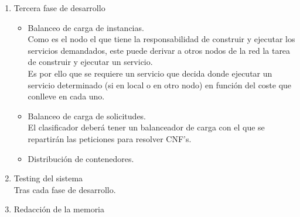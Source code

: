 \documentclass[11pt]{article}
\begin{document}
\begin{enumerate}
\begin{itemize}
					Por un lado se ha de desarrollar un sistema que genere CNFs aleatorios, 
					pruebe cada uno de los solvers y recoja datos de ello. 
					A partir de los datos obtenidos previamente se deben clasificar los solvers mediante algun tipo de regresión.
					\\
					Por otra parte, el servicio debe de tener la capacidad de, a partir de un CNF dado, 
					resolverlo dando uso del solver que mejor se adapte a ese CNF en concreto.
				\end{itemize}
			\item Tercera fase de desarrollo
				\begin{itemize}
					\item Balanceo de carga de instancias. \\
						Como es el nodo el que tiene la responsabilidad de construir y ejecutar los servicios demandados,
						este puede derivar a otros nodos de la red la tarea de construir y ejecutar un servicio. \\
						Es por ello que se requiere un servicio que decida donde ejecutar un servicio determinado (si en local o en otro nodo)
						en función del coste que conlleve en cada uno.
					\item Balanceo de carga de solicitudes. \\
						El clasificador deberá tener un balanceador de carga
						con el que se repartirán las peticiones para resolver CNF's.
					\item Distribución de contenedores.
				\end{itemize}
			\item Testing del sistema
				\\ Tras cada fase de desarrollo.
			\item Redacción de la memoria
		\end{enumerate}
\end{document}
